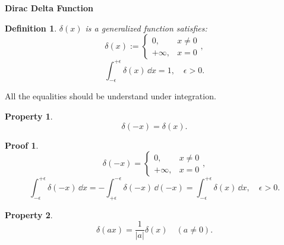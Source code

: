 \documentclass{article}
\theoremstyle{1}
\newtheorem{definition}{Definition}
\newtheorem{property}{Property}
\theoremstyle{2}
\newtheorem*{proof_env}{Proof}
\begin{document}
\begin{center}
    \huge{\textbf{Dirac Delta Function}}
\end{center}
\begin{definition}
    $\delta(x)$ is a generalized function satisfies:
    \begin{equation}
        \delta(x):=\left\{\begin{matrix}
            0,&x\not=0\\
            +\infty,&x=0
        \end{matrix} \right. ,
    \end{equation}
    \begin{equation}
        \int_{-\epsilon}^{+\epsilon}\delta(x)\, \dd x=1,\quad\epsilon>0.
    \end{equation}
    
\end{definition}
All the equalities should be understand under integration.
\begin{property}
        \begin{equation}\label{3}
            \delta(-x)=\delta(x).
        \end{equation}
\end{property}
\begin{proof_env}
    \begin{equation}
        \delta(-x)=\left\{\begin{matrix}
           0,&x\not=0\\
            +\infty,&x=0 
        \end{matrix}\right. ,
    \end{equation}
    \begin{equation}
       \int_{-\epsilon}^{+\epsilon}\delta(-x)\, \dd x=-\int_{+\epsilon}^{-\epsilon}\delta(-x)\, \dd (-x)=\int_{-\epsilon}^{+\epsilon}\delta(x)\, \dd x,\quad\epsilon>0.
    \end{equation}
\end{proof_env}
\begin{property}\label{p2}
    \begin{equation}
            \delta(ax)=\frac{1}{\left|a\right|}\delta(x)\quad (a\not=0).
    \end{equation}
\end{property}
\end{document}
